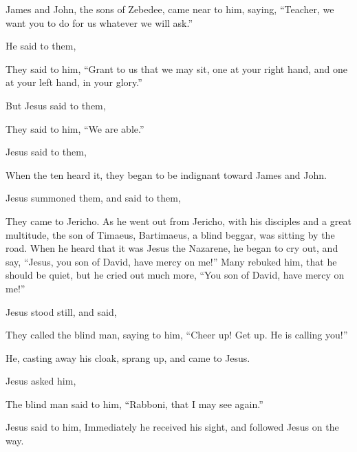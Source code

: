 {\par }{\PP {}James and John, the sons of Zebedee, came near to him, saying, “Teacher, we want you to do for us whatever we will ask.”
\par }{\PP {}He said to them,
{}
\par }{\PP {}They said to him, “Grant to us that we may sit, one at your right hand, and one at your left hand, in your glory.”
\par }{\PP {}But Jesus said to them,
{}
\par }{\PP {}They said to him, “We are able.”
\par }{\PP Jesus said to them,
{}
\par }{\PP {}When the ten heard it, they began to be indignant toward James and John.
\par }{\PP {}Jesus summoned them, and said to them,
{}
\par }{\PP {}They came to Jericho. As he went out from Jericho, with his disciples and a great multitude, the son of Timaeus, Bartimaeus, a blind beggar, was sitting by the road.
When he heard that it was Jesus the Nazarene, he began to cry out, and say, “Jesus, you son of David, have mercy on me!”
Many rebuked him, that he should be quiet, but he cried out much more, “You son of David, have mercy on me!”
\par }{\PP {}Jesus stood still, and said,
{}
\par }{\PP They called the blind man, saying to him, “Cheer up! Get up. He is calling you!”
\par }{\PP {}He, casting away his cloak, sprang up, and came to Jesus.
\par }{\PP {}Jesus asked him,
{}
\par }{\PP The blind man said to him, “Rabboni, that I may see again.”
\par }{\PP {}Jesus said to him,
{} Immediately he received his sight, and followed Jesus on the way.

}
